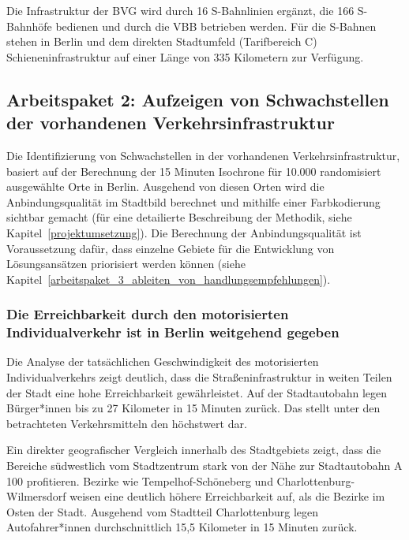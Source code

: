 Die Infrastruktur der BVG wird durch 16 S-Bahnlinien ergänzt, die 166 S-Bahnhöfe bedienen und durch die VBB betrieben werden. Für die S-Bahnen stehen in Berlin und dem direkten Stadtumfeld (Tarifbereich C) Schieneninfrastruktur auf einer Länge von 335 Kilometern zur Verfügung.

\subsection{Arbeitspaket 2: Aufzeigen von Schwachstellen der vorhandenen Verkehrsinfrastruktur}
\label{arbeitspaket_2_aufzeigen_von_schwachstellen_der_vorhandenen_infrastruktur}

Die Identifizierung von Schwachstellen in der vorhandenen Verkehrsinfrastruktur, basiert auf der Berechnung der 15 Minuten Isochrone für 10.000 randomisiert ausgewählte Orte in Berlin. Ausgehend von diesen Orten wird die Anbindungsqualität im Stadtbild berechnet und mithilfe einer Farbkodierung sichtbar gemacht (für eine detailierte Beschreibung der Methodik, siehe Kapitel~\ref{projektumsetzung}). Die Berechnung der Anbindungsqualität ist Voraussetzung dafür, dass einzelne Gebiete für die Entwicklung von Lösungsansätzen priorisiert werden können (siehe Kapitel~\ref{arbeitspaket_3_ableiten_von_handlungsempfehlungen}).

\subsubsection{Die Erreichbarkeit durch den motorisierten Individualverkehr ist in Berlin weitgehend gegeben}

Die Analyse der tatsächlichen Geschwindigkeit des motorisierten Individualverkehrs zeigt deutlich, dass die Straßeninfrastruktur in weiten Teilen der Stadt eine hohe Erreichbarkeit gewährleistet. Auf der Stadtautobahn legen Bürger*innen bis zu 27 Kilometer in 15 Minuten zurück. Das stellt unter den betrachteten Verkehrsmitteln den höchstwert dar.


Ein direkter geografischer Vergleich innerhalb des Stadtgebiets zeigt, dass die Bereiche südwestlich vom Stadtzentrum stark von der Nähe zur Stadtautobahn A 100 profitieren. Bezirke wie Tempelhof-Schöneberg und Charlottenburg-Wilmersdorf weisen eine deutlich höhere Erreichbarkeit auf, als die Bezirke im Osten der Stadt. Ausgehend vom Stadtteil Charlottenburg legen Autofahrer*innen durchschnittlich 15,5 Kilometer in 15 Minuten zurück.


